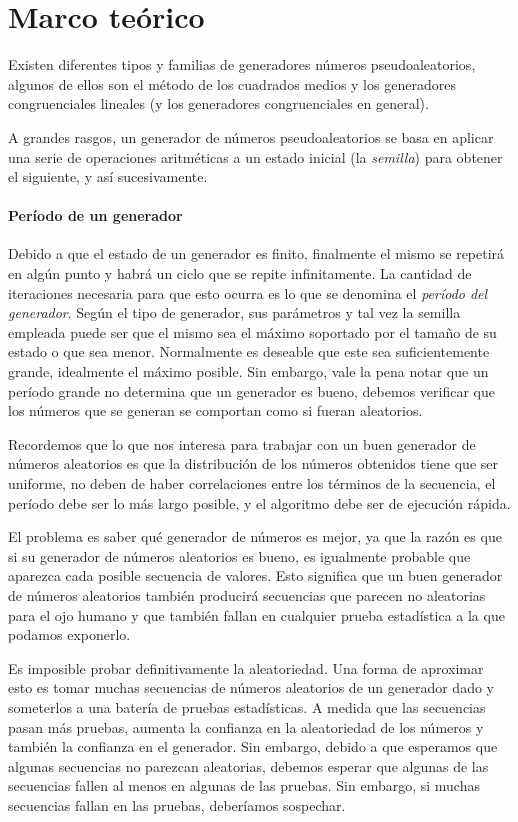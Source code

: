 \section{Marco teórico}
Existen diferentes tipos y familias de generadores números pseudoaleatorios, algunos de ellos son el método de los cuadrados medios y los generadores congruenciales lineales (y los generadores congruenciales en general).

A grandes rasgos, un generador de números pseudoaleatorios se basa en aplicar una serie de operaciones aritméticas a un estado inicial (la \emph{semilla}) para obtener el siguiente, y así sucesivamente.

\paragraph{Período de un generador}
Debido a que el estado de un generador es finito, finalmente el mismo se repetirá en algún punto y habrá un ciclo que se repite infinitamente. La cantidad de iteraciones necesaria para que esto ocurra es lo que se denomina el \emph{período del generador}. Según el tipo de generador, sus parámetros y tal vez la semilla empleada puede ser que el mismo sea el máximo soportado por el tamaño de su estado o que sea menor. Normalmente es deseable que este sea suficientemente grande, idealmente el máximo posible. Sin embargo, vale la pena notar que un período grande no determina que un generador es bueno, debemos verificar que los números que se generan se comportan como si fueran aleatorios.

Recordemos que lo que nos interesa para trabajar con un buen generador de números aleatorios es que la distribución de los números obtenidos tiene que ser uniforme, no deben de haber correlaciones entre los términos de la secuencia, el período debe ser lo más largo posible, y el algoritmo debe ser de ejecución rápida.

El problema es saber qué generador de números es mejor, ya que la razón es que si su generador de números aleatorios es bueno, es igualmente probable que aparezca cada posible secuencia de valores. Esto significa que un buen generador de números aleatorios también producirá secuencias que parecen no aleatorias para el ojo humano y que también fallan en cualquier prueba estadística a la que podamos exponerlo.

Es imposible probar definitivamente la aleatoriedad. Una forma de aproximar esto es tomar muchas secuencias de números aleatorios de un generador dado y someterlos a una batería de pruebas estadísticas. A medida que las secuencias pasan más pruebas, aumenta la confianza en la aleatoriedad de los números y también la confianza en el generador. Sin embargo, debido a que esperamos que algunas secuencias no parezcan aleatorias, debemos esperar que algunas de las secuencias fallen al menos en algunas de las pruebas. Sin embargo, si muchas secuencias fallan en las pruebas, deberíamos sospechar.

